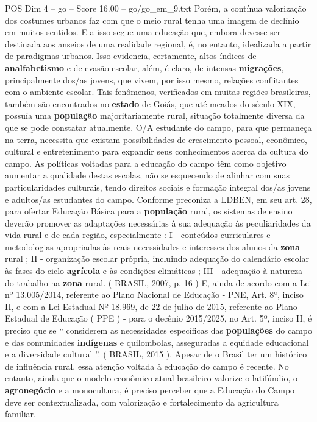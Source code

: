 \begin{textsample}{POS Dim 4 – go – Score 16.00 – go/go\_em\_9.txt}
Porém, a contínua valorização dos costumes urbanos faz com que o meio rural tenha uma imagem de declínio em muitos sentidos.
E a isso segue uma educação que, embora devesse ser destinada aos anseios de uma realidade regional, é, no entanto, idealizada a partir de paradigmas urbanos.
Isso evidencia, certamente, altos índices de \textbf{analfabetismo} e de evasão escolar, além, é claro, de intensas \textbf{migrações}, principalmente dos/as jovens, que vivem, por isso mesmo, relações conflitantes com o ambiente escolar.
Tais fenômenos, verificados em muitas regiões brasileiras, também são encontrados no \textbf{estado} de Goiás, que até meados do século XIX, possuía uma \textbf{população} majoritariamente rural, situação totalmente diversa da que se pode constatar atualmente.
O/A estudante do campo, para que permaneça na terra, necessita que existam possibilidades de crescimento pessoal, econômico, cultural e entretenimento para expandir seus conhecimentos acerca da cultura do campo.
As políticas voltadas para a educação do campo têm como objetivo aumentar a qualidade destas escolas, não se esquecendo de alinhar com suas particularidades culturais, tendo direitos sociais e formação integral dos/as jovens e adultos/as estudantes do campo.
Conforme preconiza a LDBEN, em seu art. 28, para ofertar Educação Básica para a \textbf{população} rural, os sistemas de ensino deverão promover as adaptações necessárias à sua adequação às peculiaridades da vida rural e de cada região, especialmente : I - conteúdos curriculares e metodologias apropriadas às reais necessidades e interesses dos alunos da \textbf{zona} rural ; II - organização escolar própria, incluindo adequação do calendário escolar às fases do ciclo \textbf{agrícola} e às condições climáticas ; III - adequação à natureza do trabalho na \textbf{zona} rural. ( BRASIL, 2007, p. 16 ) E, ainda de acordo com a Lei nº 13.005/2014, referente ao Plano Nacional de Educação - PNE, Art. 8º, inciso II, e com a Lei Estadual Nº 18.969, de 22 de julho de 2015, referente ao Plano Estadual de Educação ( PPE ) - para o decênio 2015/2025, no Art. 5º, inciso II, é preciso que se “ considerem as necessidades específicas das \textbf{populações} do campo e das comunidades \textbf{indígenas} e quilombolas, asseguradas a equidade educacional e a diversidade cultural ”. ( BRASIL, 2015 ).
Apesar de o Brasil ter um histórico de influência rural, essa atenção voltada à educação do campo é recente.
No entanto, ainda que o modelo econômico atual brasileiro valorize o latifúndio, o \textbf{agronegócio} e a monocultura, é preciso perceber que a Educação do Campo deve ser contextualizada, com valorização e fortalecimento da agricultura familiar.

\end{textsample}
